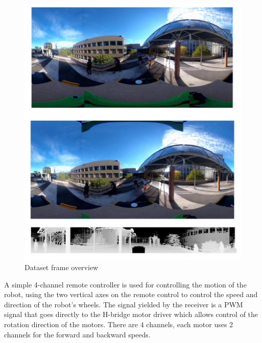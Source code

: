 \documentclass[english, LaM, oneside]{sapthesis}%
\begin{document}
\begin{figure}[h!] %
    \centering
    \includegraphics[width=\linewidth]{Images/c1.jpeg}
    \caption{Dataset frame overview}
    \label{fig:l}
\end{figure}

A simple 4-channel remote controller is used for controlling the motion of the robot, using the two vertical axes on the remote control to control the speed and direction of the robot’s wheels. The signal yielded by the receiver is a PWM signal that goes directly to the H-bridge motor driver which allows control of the rotation direction of the motors. There are 4 channels, each motor uses 2 channels for the forward and backward speeds.
\end{document}
